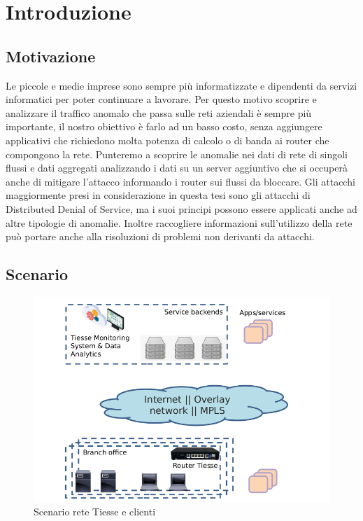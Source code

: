 \chapter{Introduzione}

\section{Motivazione}

Le piccole e medie imprese sono sempre più informatizzate e dipendenti da servizi informatici per poter continuare a lavorare. Per questo motivo scoprire e analizzare il traffico anomalo che passa sulle reti aziendali è sempre più importante, il nostro obiettivo è farlo ad un basso costo, senza aggiungere applicativi che richiedono molta potenza di calcolo o di banda ai router che compongono la rete. Punteremo a scoprire le anomalie nei dati di rete di singoli flussi e dati aggregati analizzando i dati su un server aggiuntivo che si occuperà anche di mitigare l'attacco informando i router sui flussi da bloccare.
Gli attacchi maggiormente presi in considerazione in questa tesi sono gli attacchi di Distributed Denial of Service, ma i suoi principi possono essere applicati anche ad altre tipologie di anomalie.
Inoltre raccogliere informazioni sull'utilizzo della rete può portare anche alla risoluzioni di problemi non derivanti da attacchi.

\section{Scenario}
\begin{figure}[]
    \label{fig:scenario}
    \includegraphics[width=\hsize]{images/introduzione/scenario_2.png}
    \caption{Scenario rete Tiesse e clienti}
    \centering
\end{figure}

